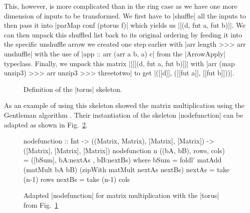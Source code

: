 This, however, is more complicated than in the ring case as we have one more dimension of inputs to be transformed. We first have to |shuffle| all the inputs to then pass it into |parMap conf (ptorus f)| which yields us |[(d, fut a, fut b)]|. We can then unpack this shuffled list back to its original ordering by feeding it into the specific unshuffle arrow we created one step earlier with |arr length >>> arr unshuffle| with the use of |app :: arr (arr a b, a) c| from the |ArrowApply| typeclass. Finally, we unpack this matrix |[[[(d, fut a, fut b)]]| with |arr (map unzip3) >>> arr unzip3 >>> threetotwo| to get  |([[d]], ([[fut a]], [[fut b]]))|.

\begin{figure}[h]
\caption{Definition of the |torus| skeleton.}
\label{fig:torus}
\end{figure}
As an example of using this skeleton \citep{Loogen2012} showed the matrix multiplication using the Gentleman algorithm \citep{Gentleman1978}. Their instantiation of the skeleton |nodefunction| can be adapted as shown in Fig.~\ref{fig:torusMatMult}.
\begin{figure}[h]
\begin{code}
nodefunction :: Int -> ((Matrix, Matrix), [Matrix], [Matrix]) -> ([Matrix], [Matrix], [Matrix])
nodefunction n ((bA, bB), rows, cols) = ([bSum], bA:nextAs , bB:nextBs)
		where bSum = foldl' matAdd (matMult bA bB) (zipWith matMult nextAs nextBs)
			     nextAs = take (n-1) rows
			     nextBs = take (n-1) cols
\end{code}
\caption{Adapted |nodefunction| for matrix multiplication with the |torus| from Fig.~\ref{fig:torus}}
\label{fig:torusMatMult}
\end{figure}
